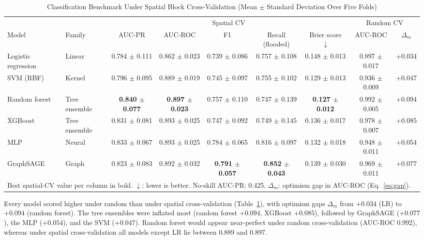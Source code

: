 \begin{table}[!t]
  \caption{Classification Benchmark Under Spatial Block Cross-Validation (Mean $\pm$ Standard Deviation Over Five Folds)}
  \label{tab:models}
  \centering
  \footnotesize
  \setlength{\tabcolsep}{3pt}
  \begin{tabular}{llccccccc}
    \toprule
    & & \multicolumn{5}{c}{Spatial CV} & \multicolumn{2}{c}{Random CV} \\
    \cmidrule(lr){3-7}\cmidrule(lr){8-9}
    Model & Family & AUC-PR & AUC-ROC & F1 & Recall (flooded) & Brier score $\downarrow$ & AUC-ROC & $\Delta_m$ \\
    \midrule
    Logistic regression & Linear        & 0.784 $\pm$ 0.111 & 0.862 $\pm$ 0.023 & 0.739 $\pm$ 0.086 & 0.757 $\pm$ 0.108 & 0.148 $\pm$ 0.013 & 0.897 $\pm$ 0.017 & +0.034 \\
    SVM (RBF)           & Kernel        & 0.796 $\pm$ 0.095 & 0.889 $\pm$ 0.019 & 0.745 $\pm$ 0.097 & 0.755 $\pm$ 0.102 & 0.129 $\pm$ 0.013 & 0.936 $\pm$ 0.009 & +0.047 \\
    Random forest       & Tree ensemble & \textbf{0.840 $\pm$ 0.077} & \textbf{0.897 $\pm$ 0.023} & 0.757 $\pm$ 0.110 & 0.747 $\pm$ 0.139 & \textbf{0.127 $\pm$ 0.012} & 0.992 $\pm$ 0.005 & +0.094 \\
    XGBoost             & Tree ensemble & 0.831 $\pm$ 0.081 & 0.893 $\pm$ 0.025 & 0.747 $\pm$ 0.092 & 0.749 $\pm$ 0.145 & 0.136 $\pm$ 0.017 & 0.978 $\pm$ 0.007 & +0.085 \\
    MLP                 & Neural        & 0.833 $\pm$ 0.067 & 0.893 $\pm$ 0.025 & 0.784 $\pm$ 0.065 & 0.816 $\pm$ 0.097 & 0.132 $\pm$ 0.018 & 0.948 $\pm$ 0.011 & +0.054 \\
    GraphSAGE           & Graph         & 0.823 $\pm$ 0.083 & 0.892 $\pm$ 0.032 & \textbf{0.791 $\pm$ 0.057} & \textbf{0.852 $\pm$ 0.043} & 0.139 $\pm$ 0.030 & 0.969 $\pm$ 0.011 & +0.077 \\
    \bottomrule
    \multicolumn{9}{l}{\scriptsize Best spatial-CV value per column in bold. $\downarrow$: lower is better. No-skill AUC-PR: 0.425. $\Delta_m$: optimism gap in AUC-ROC (Eq.~\ref{eq:gap}).}
  \end{tabular}
\end{table}

Every model scored higher under random than under spatial cross-validation (Table~\ref{tab:models}), with optimism gaps $\Delta_m$ from $+0.034$ (LR) to $+0.094$ (random forest). The tree ensembles were inflated most (random forest $+0.094$, XGBoost $+0.085$), followed by GraphSAGE ($+0.077$), the MLP ($+0.054$), and the SVM ($+0.047$). Random forest would appear near-perfect under random cross-validation (AUC-ROC 0.992), whereas under spatial cross-validation all models except LR lie between 0.889 and 0.897.


